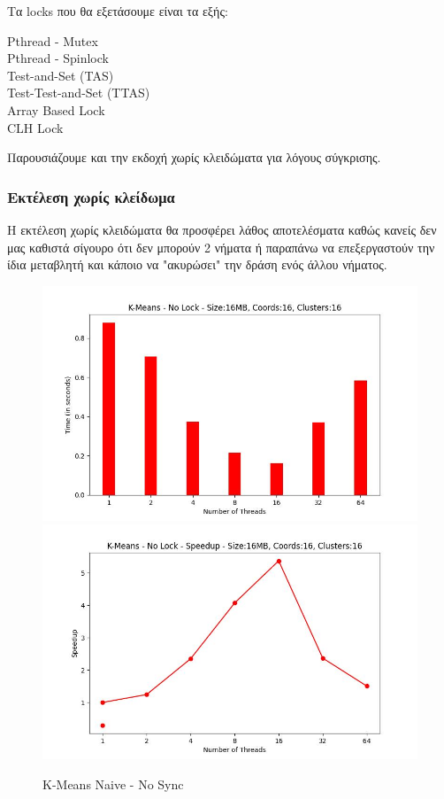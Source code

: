\documentclass[letterpaper,12pt]{article}
\begin{document}
Τα locks που θα εξετάσουμε είναι τα εξής:

\begin{description}
    \item [Pthread - Mutex]
    \item [Pthread - Spinlock]
    \item [Test-and-Set (TAS)]
    \item [Test-Test-and-Set (TTAS)]
    \item [Array Based Lock] 
    \item [CLH Lock] 
\end{description}

Παρουσιάζουμε και την εκδοχή χωρίς κλειδώματα για λόγους σύγκρισης.

\subsubsection{Εκτέλεση χωρίς κλείδωμα}

Η εκτέλεση χωρίς κλειδώματα θα προσφέρει λάθος αποτελέσματα καθώς κανείς δεν μας
καθιστά σίγουρο ότι δεν μπορούν 2 νήματα ή παραπάνω να επεξεργαστούν την ίδια μεταβλητή και 
κάποιο να "ακυρώσει" την δράση ενός άλλου νήματος.

\begin{figure}[H]
    \centering
        \includegraphics[scale=0.4]{outFilesAffinityMouliko/plots/kmeans_locks_nosync.jpg}
        \includegraphics[scale=0.4]{outFilesAffinityMouliko/plots/kmeans_locks_nosync_speedup.jpg}
    \caption{K-Means Naive - No Sync}
    \label{fig:K-Means Naive - No Sync}
\end{figure}
\end{document}
